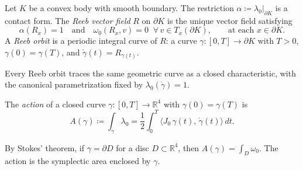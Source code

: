 \begin{definition}\label{def:reeb-orbit-smooth}
Let $K$ be a convex body with smooth boundary.
The restriction $\alpha \coloneqq \lambda_0|_{\partial K}$ is a contact form.
The \emph{Reeb vector field} $R$ on $\partial K$ is the unique vector field
satisfying
\[
  \alpha(R_x) = 1
  \quad\text{and}\quad
  \omega_0(R_x, v) = 0 \;\;\forall\, v \in T_x(\partial K),
  \qquad \text{at each } x \in \partial K.
\]
A \emph{Reeb orbit} is a periodic integral curve of $R$: a curve
$\gamma \colon [0, T] \to \partial K$ with $T > 0$,
$\gamma(0) = \gamma(T)$, and $\dot{\gamma}(t) = R_{\gamma(t)}$.

Every Reeb orbit traces the same geometric curve as a closed characteristic,
with the canonical parametrization fixed by
$\lambda_0(\dot{\gamma}) = 1$.
\end{definition}

\begin{definition}[Action]\label{def:action}
The \emph{action} of a closed curve $\gamma \colon [0, T] \to \mathbb{R}^4$
with $\gamma(0) = \gamma(T)$ is
\[
  A(\gamma) \coloneqq \int_\gamma \lambda_0
  = \frac{1}{2} \int_0^T \langle J_0\, \gamma(t),\, \dot{\gamma}(t) \rangle \, dt.
\]
\end{definition}

\begin{remark}\label{rem:action-geometric}
By Stokes' theorem, if $\gamma = \partial D$ for a disc $D \subset \mathbb{R}^4$,
then $A(\gamma) = \int_D \omega_0$.
The action is the symplectic area enclosed by $\gamma$.
\end{remark}

